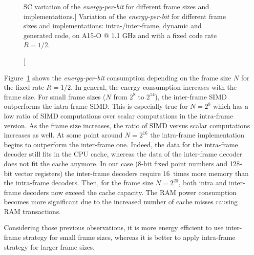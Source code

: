\begin{figure}[htp]
  \centering
  \quad
  \caption
    [SC variation of the \emph{energy-per-bit} for different frame sizes and
    implementations.]
    {Variation of the \emph{energy-per-bit} for different frame sizes and
    implementations: intra-/inter-frame, dynamic and generated code, on A15-O @
    1.1 GHz and with a fixed code rate $R = 1/2$.}
  \label{plot:eval_polar_sc_energy_implems_vs}
\end{figure}

Figure~\ref{plot:eval_polar_sc_energy_implems_vs} shows the
\emph{energy-per-bit} consumption depending on the frame size $N$ for the fixed
rate $R = 1/2$. In general, the energy consumption increases with the frame
size. For small frame sizes ($N$ from $2^{8}$ to $2^{14}$), the inter-frame SIMD
outperforms the intra-frame SIMD. This is especially true for $N = 2^8$ which
has a low ratio of SIMD computations over scalar computations in the intra-frame
version. As the frame size increases, the ratio of SIMD versus scalar
computations increases as well. At some point around $N = 2^{16}$ the
intra-frame implementation begins to outperform the inter-frame one. Indeed, the
data for the intra-frame decoder still fits in the CPU cache, whereas the data
of the inter-frame decoder does not fit the cache anymore. In our case (8-bit
fixed point numbers and 128-bit vector registers) the inter-frame decoders
require 16~times more memory than the intra-frame decoders. Then, for the frame
size $N = 2^{20}$, both intra and inter-frame decoders now exceed the cache
capacity. The RAM power consumption becomes more significant due to the
increased number of cache misses causing RAM transactions.

Considering those previous observations, it is more energy efficient to use
inter-frame strategy for small frame sizes, whereas it is better to apply
intra-frame strategy for larger frame sizes.


